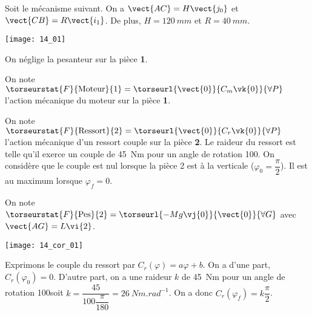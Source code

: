 \normalfalse \difficiletrue \tdifficilefalse
\correctiontrue


\setcounter{question}{0}
\ifcorrection
\else
{}
\fi

\ifprof
\else
Soit le mécanisme suivant. On a $\vect{AC}=H\vect{j_0}$ et $\vect{CB}=R\vect{i_1}$. De plus, 
$H=\SI{120}{mm}$ et $R=\SI{40}{mm}$. 

\begin{center}
\texttt{[image: 14\_01]}
\end{center}
\fi

On néglige la pesanteur sur la pièce \textbf{1}. 

On note $\torseurstat{F}{\text{Moteur}}{1} = \torseurl{\vect{0}}{C_m\vk{0}}{\forall P}$ l'action mécanique du moteur sur la pièce \textbf{1}.

On note $\torseurstat{F}{\text{Ressort}}{2} = \torseurl{\vect{0}}{C_r\vk{0}}{\forall P}$ l'action mécanique d'un ressort couple sur la pièce \textbf{2}. Le raideur du ressort est telle qu'il exerce un couple de \SI{45}{Nm} pour un angle de rotation 100\degres. On considère que le couple est nul lorsque la pièce 2 est à la verticale ($\varphi_0=\dfrac{\pi}{2}$). Il est au maximum lorsque $\varphi_f=0$.

On note $\torseurstat{F}{\text{Pes}}{2} = \torseurl{-Mg\vj{0}}{\vect{0}}{\forall G}$ avec $\vect{AG}=L\vi{2}$. 

\ifprof
\begin{center}
\texttt{[image: 14\_cor\_01]}
\end{center}
\else
\fi

\ifprof
Exprimons le couple du ressort par $C_r(\varphi)=a\varphi + b$. On a d'une part, $C_r(\varphi_0)=0$. D'autre part, on a une raideur $k$ de \SI{45}{Nm} pour un angle de rotation 100\degres soit $k=\dfrac{45}{100 \dfrac{\pi}{180}} = \SI{26}{Nm.rad^{-1}}$. On a donc  $C_r(\varphi_f)=k \dfrac{\pi}{2}$.

